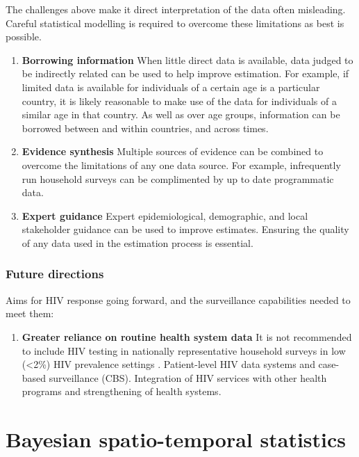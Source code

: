 \documentclass[a4paper, nobind]{templates/ociamthesis}
\providecommand{\tightlist}{%
  \setlength{\itemsep}{0pt}\setlength{\parskip}{0pt}}
\begin{document}
The challenges above make it direct interpretation of the data often misleading.
Careful statistical modelling is required to overcome these limitations as best is possible.

\begin{enumerate}
\def\labelenumi{\arabic{enumi}.}
\tightlist
\item
  \textbf{Borrowing information}
  When little direct data is available, data judged to be indirectly related can be used to help improve estimation.
  For example, if limited data is available for individuals of a certain age is a particular country, it is likely reasonable to make use of the data for individuals of a similar age in that country.
  As well as over age groups, information can be borrowed between and within countries, and across times.
\item
  \textbf{Evidence synthesis}
  Multiple sources of evidence can be combined to overcome the limitations of any one data source.
  For example, infrequently run household surveys can be complimented by up to date programmatic data.
\item
  \textbf{Expert guidance}
  Expert epidemiological, demographic, and local stakeholder guidance can be used to improve estimates.
  Ensuring the quality of any data used in the estimation process is essential.
\end{enumerate}

\hypertarget{future-directions}{%
\subsection{Future directions}\label{future-directions}}

Aims for HIV response going forward, and the surveillance capabilities needed to meet them:

\begin{enumerate}
\def\labelenumi{\arabic{enumi}.}
\tightlist
\item
  \textbf{Greater reliance on routine health system data} It is not recommended to include HIV testing in nationally representative household surveys in low (\textless2\%) HIV prevalence settings \autocite{world2005guidelines}. Patient-level HIV data systems \autocite{world2017consolidated} and case-based surveillance (CBS). Integration of HIV services with other health programs and strengthening of health systems.
\end{enumerate}

\hypertarget{bayes-st}{%
\chapter{Bayesian spatio-temporal statistics}\label{bayes-st}}
\end{document}
